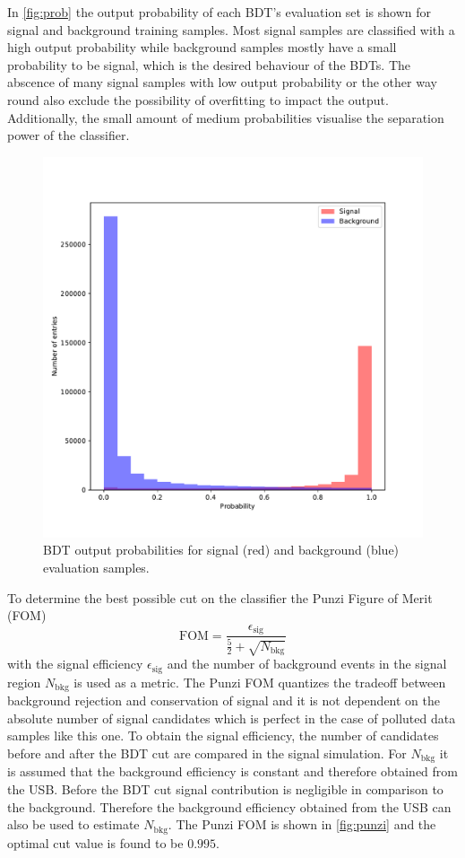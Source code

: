 In \autoref{fig:prob} the output probability of each BDT's evaluation set is shown for signal and background training samples. Most signal samples are classified with a high output probability while background samples mostly have a small probability to be signal, which is the desired behaviour of the BDTs. The abscence of many signal samples with low output probability or the other way round also exclude the possibility of overfitting to impact the output. Additionally, the small amount of medium probabilities visualise the separation power of the classifier.

\begin{figure}[tb]
  \centering
  \includegraphics[width=12cm]{plots/prob.pdf}
  \caption{BDT output probabilities for signal (red) and background (blue) evaluation samples.}
  \label{fig:probs}
\end{figure}

To determine the best possible cut on the classifier the Punzi Figure of Merit (FOM)
\begin{equation*}
  \mathrm{FOM} = \frac{\epsilon_\mathrm{sig}}{\frac{5}{2} + \sqrt{N_\mathrm{bkg}}}
\end{equation*}
with the signal efficiency $\epsilon_\mathrm{sig}$ and the number of background events in the signal region $N_\mathrm{bkg}$ is used as a metric. The Punzi FOM quantizes the tradeoff between background rejection and conservation of signal and it is not dependent on the absolute number of signal candidates which is perfect in the case of polluted data samples like this one.
To obtain the signal efficiency, the number of candidates before and after the BDT cut are compared in the signal simulation. For $N_\mathrm{bkg}$ it is assumed that the background efficiency is constant and therefore obtained from the USB. Before the BDT cut signal contribution is negligible in comparison to the background. Therefore the background efficiency obtained from the USB can also be used to estimate $N_\mathrm{bkg}$.
The Punzi FOM is shown in \autoref{fig:punzi} and the optimal cut value is found to be $\num{0.995}$.


